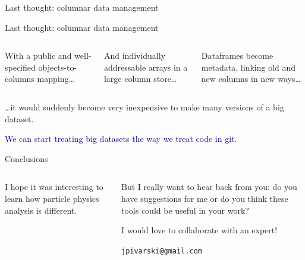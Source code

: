 \documentclass[aspectratio=169]{beamer}
\begin{document}
\begin{frame}{Last thought: columnar data management}
\begin{uncoverenv}
\begin{center}
\end{center}
\end{uncoverenv}
\end{frame}

\begin{frame}{Last thought: columnar data management}
\begin{columns}[t]
With a public and well-specified objects-to-columns mapping\ldots

And individually addressable arrays in a large column store\ldots

Dataframes become metadata, linking old and new columns in new ways\ldots
\end{columns}

\vspace{0.5 cm}
\ldots it would suddenly become very inexpensive to make many versions of a big dataset.

\vspace{0.5 cm}
\textcolor{darkblue}{We can start treating big datasets the way we treat code in git.}
\end{frame}

\begin{frame}{Conclusions}
\large
\begin{columns}[t]
\begin{center}
I hope it was interesting to learn how particle physics analysis is different.
\end{center}

\begin{center}
But I really want to hear back from you: do you have suggestions for me or do you think these tools could be useful in your work?

\vspace{0.5 cm}
I would love to collaborate with an expert!

\vspace{0.5 cm}
{\tt jpivarski@gmail.com}
\end{center}

\end{columns}
\end{frame}
\end{document}
